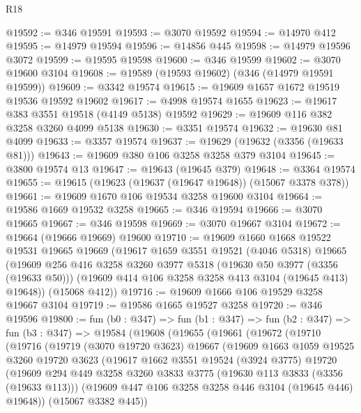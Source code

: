 \begin{lexlean}{R18}
\begin{coremodule}
@19592 := @346 @19591
@19593 := @3070 @19592
@19594 := @14970 @412
@19595 := @14979 @19594
@19596 := @14856 @445
@19598 := @14979 @19596 @3072
@19599 := @19595 @19598
@19600 := @346 @19599
@19602 := @3070 @19600 @3104
@19608 := @19589 (@19593 @19602) (@346 (@14979 @19591 @19599))
@19609 := @3342 @19574
@19615 := @19609 @1657 @1672 @19519 @19536 @19592 @19602
@19617 := @4998 @19574 @1655
@19623 := @19617 @383 @3551 @19518 (@4149 @5138) @19592
@19629 := @19609 @116 @382 @3258 @3260 @4099 @5138
@19630 := @3351 @19574
@19632 := @19630 @81 @4099
@19633 := @3357 @19574
@19637 := @19629 (@19632 (@3356 (@19633 @81)))
@19643 := @19609 @380 @106 @3258 @3258 @379 @3104
@19645 := @3800 @19574 @13
@19647 := @19643 (@19645 @379)
@19648 := @3364 @19574
@19655 := @19615 (@19623 (@19637 (@19647 @19648)) (@15067 @3378 @378))
@19661 := @19609 @1670 @106 @19534 @3258 @19600 @3104
@19664 := @19586 @1669 @19532 @3258
@19665 := @346 @19594
@19666 := @3070 @19665
@19667 := @346 @19598
@19669 := @3070 @19667 @3104
@19672 := @19664 (@19666 @19669) @19600
@19710 := @19609
    @1660
    @1668
    @19522
    @19531
    @19665
    @19669
    (@19617
      @1659
      @3551
      @19521
      (@4046 @5318)
      @19665
      (@19609
        @256
        @416
        @3258
        @3260
        @3977
        @5318
        (@19630 @50 @3977 (@3356 (@19633 @50)))
        (@19609 @414 @106 @3258 @3258 @413 @3104 (@19645 @413) @19648))
      (@15068 @412))
@19716 := @19609 @1666 @106 @19529 @3258 @19667 @3104
@19719 := @19586 @1665 @19527 @3258
@19720 := @346 @19596
@19800 := fun (b0 : @347) =>
  fun (b1 : @347) =>
  fun (b2 : @347) =>
  fun (b3 : @347) =>
  @19584
    (@19608
      (@19655
        (@19661
          (@19672
            (@19710
              (@19716
                (@19719
                  (@3070 @19720 @3623)
                  @19667
                  (@19609
                    @1663
                    @1059
                    @19525
                    @3260
                    @19720
                    @3623
                    (@19617
                      @1662
                      @3551
                      @19524
                      (@3924 @3775)
                      @19720
                      (@19609
                        @294
                        @449
                        @3258
                        @3260
                        @3833
                        @3775
                        (@19630 @113 @3833 (@3356 (@19633 @113)))
                        (@19609 @447 @106 @3258 @3258 @446 @3104 (@19645 @446) @19648))
                      (@15067 @3382 @445))

\end{coremodule}
\end{lexlean}
